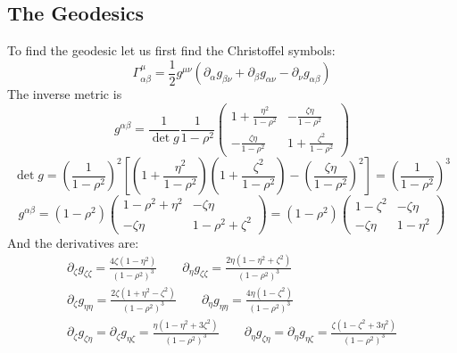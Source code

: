 \documentclass{article}
\begin{document}
\subsection{The Geodesics}
To find the geodesic let us first find the Christoffel symbols:
\begin{equation}
    \Gamma^\mu_{\alpha\beta} = \frac{1}{2}g^{\mu\nu}\left(\partial_\alpha g_{\beta\nu} + \partial_\beta g_{\alpha\nu} - \partial_\nu g_{\alpha\beta}\right)
\end{equation}
The inverse metric is
\begin{equation}
    g^{\alpha\beta} = \frac{1}{\det g}\frac{1}{1-\rho^2}\begin{pmatrix}
        1 + \frac{\eta^2}{1-\rho^2} & -\frac{\zeta\eta}{1-\rho^2} \\
        -\frac{\zeta\eta}{1-\rho^2} & 1 + \frac{\zeta^2}{1-\rho^2}
    \end{pmatrix}
\end{equation}
\begin{equation}
    \det g = \left(\frac{1}{1-\rho^2}\right)^2\left[
        \left(1 + \frac{\eta^2}{1-\rho^2}\right)\left(1 + \frac{\zeta^2}{1-\rho^2}\right) - \left(\frac{\zeta\eta}{1-\rho^2}\right)^2
    \right] = \left(\frac{1}{1-\rho^2}\right)^3
\end{equation}
\begin{equation}
    g^{\alpha\beta} = (1-\rho^2)\begin{pmatrix}
        1-\rho^2 + \eta^2 & -\zeta\eta \\
        -\zeta\eta & 1-\rho^2 + \zeta^2
    \end{pmatrix} = (1-\rho^2)\begin{pmatrix}
        1-\zeta^2 & -\zeta\eta \\
        -\zeta\eta & 1 - \eta^2
    \end{pmatrix}
\end{equation}
And the derivatives are:
\begin{equation}
\begin{gathered}
    \partial_\zeta g_{\zeta\zeta} = \frac{4\zeta(1-\eta^2)}{(1-\rho^2)^3}
    \qquad
    \partial_\eta g_{\zeta\zeta} = \frac{2\eta(1-\eta^2+\zeta^2)}{(1-\rho^2)^3}
    \\
    \partial_\zeta g_{\eta\eta} = \frac{2\zeta(1+\eta^2-\zeta^2)}{(1-\rho^2)^3}
    \qquad
    \partial_\eta g_{\eta\eta} = \frac{4\eta(1-\zeta^2)}{(1-\rho^2)^3}
    \\
    \partial_\zeta g_{\zeta\eta} = \partial_\zeta g_{\eta\zeta} = \frac{\eta(1-\eta^2+3\zeta^2)}{(1-\rho^2)^3}
    \qquad
    \partial_\eta g_{\zeta\eta} = \partial_\eta g_{\eta\zeta} = \frac{\zeta(1-\zeta^2+3\eta^2)}{(1-\rho^2)^3}
\end{gathered}
\end{equation}
\end{document}
